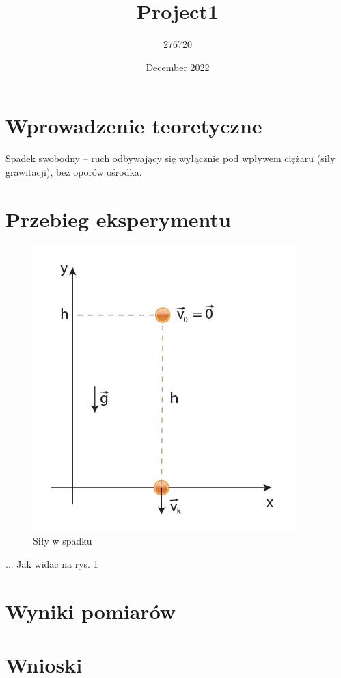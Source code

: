 \documentclass{article}
\title{Project1}
\author{276720 }
\date{December 2022}
\begin{document}
\maketitle

\section{Wprowadzenie teoretyczne}
{\Large Spadek swobodny – ruch odbywający się wyłącznie pod wpływem
 ciężaru (siły grawitacji), bez oporów ośrodka.}
\section{Przebieg eksperymentu}
   \begin{figure}[h!]
  \includegraphics[scale=0.5]{rys0010.jpg}
  \caption{Siły w spadku}
  \label{fig:birds}
\end{figure}

{\Large... Jak widac na rys. \ref{fig:birds}}
\section{Wyniki pomiarów}
\section{Wnioski}
\end{document}
